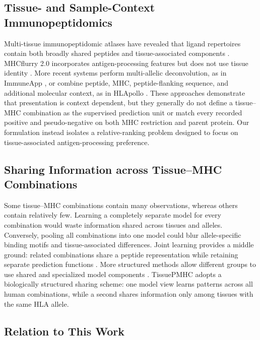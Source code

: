 \subsection{Tissue- and Sample-Context Immunopeptidomics}

Multi-tissue immunopeptidomic atlases have revealed that ligand repertoires contain both broadly shared peptides and tissue-associated components \cite{marcu2021atlas,schuster2018mouse}. MHCflurry 2.0 incorporates antigen-processing features but does not use tissue identity \cite{odonnell2020mhcflurry}. More recent systems perform multi-allelic deconvolution, as in ImmuneApp \cite{xu2024immuneapp}, or combine peptide, MHC, peptide-flanking sequence, and additional molecular context, as in HLApollo \cite{thrift2024hlapollo}. These approaches demonstrate that presentation is context dependent, but they generally do not define a tissue--MHC combination as the supervised prediction unit or match every recorded positive and pseudo-negative on both MHC restriction and parent protein. Our formulation instead isolates a relative-ranking problem designed to focus on tissue-associated antigen-processing preference.

\subsection{Sharing Information across Tissue--MHC Combinations}

Some tissue--MHC combinations contain many observations, whereas others contain relatively few. Learning a completely separate model for every combination would waste information shared across tissues and alleles. Conversely, pooling all combinations into one model could blur allele-specific binding motifs and tissue-associated differences. Joint learning provides a middle ground: related combinations share a peptide representation while retaining separate prediction functions \cite{caruana1997multitask,ruder2017overview}. More structured methods allow different groups to use shared and specialized model components \cite{ma2018mmoe,tang2020ple}. TissuePMHC adopts a biologically structured sharing scheme: one model view learns patterns across all human combinations, while a second shares information only among tissues with the same HLA allele.

\subsection{Relation to This Work}

